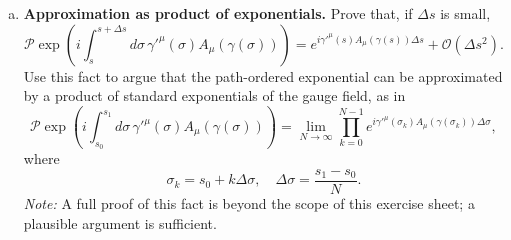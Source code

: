 \documentclass[10pt,a4paper]{article}
\theoremstyle{definition}
\begin{document}
{\begin{enumerate}[a.)]
\item \textbf{Approximation as product of exponentials.} Prove that, if $\Delta s$ is small,
    \[
    \mathcal{P} \exp \left( i \int_s^{s+\Delta s} d\sigma\, \gamma'^\mu(\sigma) A_\mu(\gamma(\sigma)) \right)
    =
    e^{i \gamma'^\mu(s) A_\mu(\gamma(s)) \Delta s} + \mathcal{O}(\Delta s^2).
    \tag{13}
    \]
    Use this fact to argue that the path-ordered exponential can be approximated by a product of standard exponentials of the gauge field, as in
    \[
    \mathcal{P} \exp \left( i \int_{s_0}^{s_1} d\sigma\, \gamma'^\mu(\sigma) A_\mu(\gamma(\sigma)) \right)
    =
    \lim_{N \to \infty}
    \prod_{k=0}^{N-1}
    e^{i \gamma'^\mu(\sigma_k) A_\mu(\gamma(\sigma_k)) \Delta \sigma},
    \tag{14}
    \]
    where
    \[
    \sigma_k = s_0 + k \Delta \sigma, \quad \Delta \sigma = \frac{s_1 - s_0}{N}.
    \tag{15}
    \]
\textit{Note:} A full proof of this fact is beyond the scope of this exercise sheet; a plausible argument is sufficient.
\end{enumerate}
}
\end{document}
